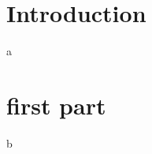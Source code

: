 \documentclass[14pt]{beamer}
\begin{document}
{
%
\begin{frame}{}
\end{frame}
}


\section{Introduction}
\begin{frame}{a}
\end{frame}


\section{first part}
\begin{frame}{b}
\end{frame}
\end{document}

